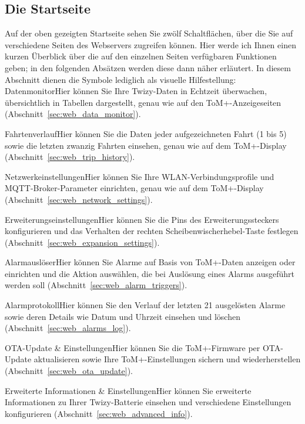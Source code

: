 \subsection{Die Startseite}

Auf der oben gezeigten Startseite sehen Sie zwölf Schaltflächen, über die Sie auf verschiedene Seiten des Webservers zugreifen können.
Hier werde ich Ihnen einen kurzen Überblick über die auf den einzelnen Seiten verfügbaren Funktionen geben; in den folgenden Absätzen
werden diese dann näher erläutert. In diesem Abschnitt dienen die Symbole lediglich als visuelle Hilfestellung:\\

{Datenmonitor}{Hier können Sie Ihre Twizy-Daten in Echtzeit überwachen, übersichtlich in Tabellen dargestellt, genau wie auf den ToM+-Anzeigeseiten (Abschnitt~\ref{sec:web_data_monitor}).}

{Fahrtenverlauf}{Hier können Sie die Daten jeder aufgezeichneten Fahrt (1 bis 5) sowie die letzten zwanzig Fahrten einsehen, genau wie auf dem ToM+-Display (Abschnitt~\ref{sec:web_trip_history}).}

{Netzwerkeinstellungen}{Hier können Sie Ihre WLAN-Verbindungsprofile und MQTT-Broker-Parameter einrichten, genau wie auf dem ToM+-Display (Abschnitt~\ref{sec:web_network_settings}).}

{Erweiterungseinstellungen}{Hier können Sie die Pins des Erweiterungssteckers konfigurieren und das Verhalten der rechten Scheibenwischerhebel-Taste festlegen (Abschnitt~\ref{sec:web_expansion_settings}).}

{Alarmauslöser}{Hier können Sie Alarme auf Basis von ToM+-Daten anzeigen oder einrichten und die Aktion auswählen, die bei Auslösung eines Alarms ausgeführt werden soll (Abschnitt~\ref{sec:web_alarm_triggers}).}

{Alarmprotokoll}{Hier können Sie den Verlauf der letzten 21 ausgelösten Alarme sowie deren Details wie Datum und Uhrzeit einsehen und löschen (Abschnitt~\ref{sec:web_alarms_log}).}

{OTA-Update & Einstellungen}{Hier können Sie die ToM+-Firmware per OTA-Update aktualisieren sowie Ihre ToM+-Einstellungen sichern und wiederherstellen (Abschnitt~\ref{sec:web_ota_update}).}

{Erweiterte Informationen & Einstellungen}{Hier können Sie erweiterte Informationen zu Ihrer Twizy-Batterie einsehen und verschiedene Einstellungen konfigurieren (Abschnitt~\ref{sec:web_advanced_info}).}

